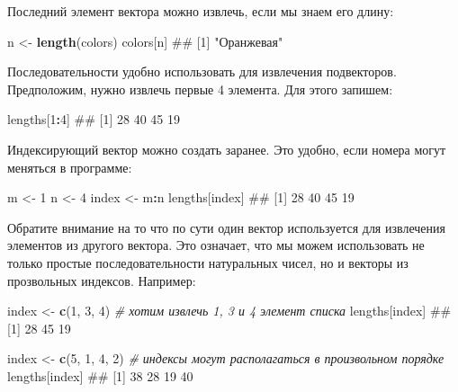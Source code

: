 \documentclass[]{book}
\newenvironment{Shaded}{\begin{snugshade}}{\end{snugshade}}
\newcommand{\KeywordTok}[1]{\textcolor[rgb]{0.13,0.29,0.53}{\textbf{#1}}}
\newcommand{\DecValTok}[1]{\textcolor[rgb]{0.00,0.00,0.81}{#1}}
\newcommand{\StringTok}[1]{\textcolor[rgb]{0.31,0.60,0.02}{#1}}
\newcommand{\CommentTok}[1]{\textcolor[rgb]{0.56,0.35,0.01}{\textit{#1}}}
\newcommand{\OperatorTok}[1]{\textcolor[rgb]{0.81,0.36,0.00}{\textbf{#1}}}
\newcommand{\NormalTok}[1]{#1}
\begin{document}
Последний элемент вектора можно извлечь, если мы знаем его длину:

\begin{Shaded}
\begin{Highlighting}[]
\NormalTok{n <-}\StringTok{ }\KeywordTok{length}\NormalTok{(colors)}
\NormalTok{colors[n]}
\NormalTok{## [1] "Оранжевая"}
\end{Highlighting}
\end{Shaded}

Последовательности удобно использовать для извлечения подвекторов.
Предположим, нужно извлечь первые 4 элемента. Для этого запишем:

\begin{Shaded}
\begin{Highlighting}[]
\NormalTok{lengths[}\DecValTok{1}\OperatorTok{:}\DecValTok{4}\NormalTok{]}
\NormalTok{## [1] 28 40 45 19}
\end{Highlighting}
\end{Shaded}

Индексирующий вектор можно создать заранее. Это удобно, если номера
могут меняться в программе:

\begin{Shaded}
\begin{Highlighting}[]
\NormalTok{m <-}\StringTok{ }\DecValTok{1}
\NormalTok{n <-}\StringTok{ }\DecValTok{4}
\NormalTok{index <-}\StringTok{ }\NormalTok{m}\OperatorTok{:}\NormalTok{n}
\NormalTok{lengths[index]}
\NormalTok{## [1] 28 40 45 19}
\end{Highlighting}
\end{Shaded}

Обратите внимание на то что по сути один вектор используется для
извлечения элементов из другого вектора. Это означает, что мы можем
использовать не только простые последовательности натуральных чисел, но
и векторы из прозвольных индексов. Например:

\begin{Shaded}
\begin{Highlighting}[]
\NormalTok{index <-}\StringTok{ }\KeywordTok{c}\NormalTok{(}\DecValTok{1}\NormalTok{, }\DecValTok{3}\NormalTok{, }\DecValTok{4}\NormalTok{) }\CommentTok{# хотим извлечь 1, 3 и 4 элемент списка}
\NormalTok{lengths[index]}
\NormalTok{## [1] 28 45 19}

\NormalTok{index <-}\StringTok{ }\KeywordTok{c}\NormalTok{(}\DecValTok{5}\NormalTok{, }\DecValTok{1}\NormalTok{, }\DecValTok{4}\NormalTok{, }\DecValTok{2}\NormalTok{) }\CommentTok{# индексы могут располагаться в произвольном порядке}
\NormalTok{lengths[index]}
\NormalTok{## [1] 38 28 19 40}
\end{Highlighting}
\end{Shaded}
\end{document}
